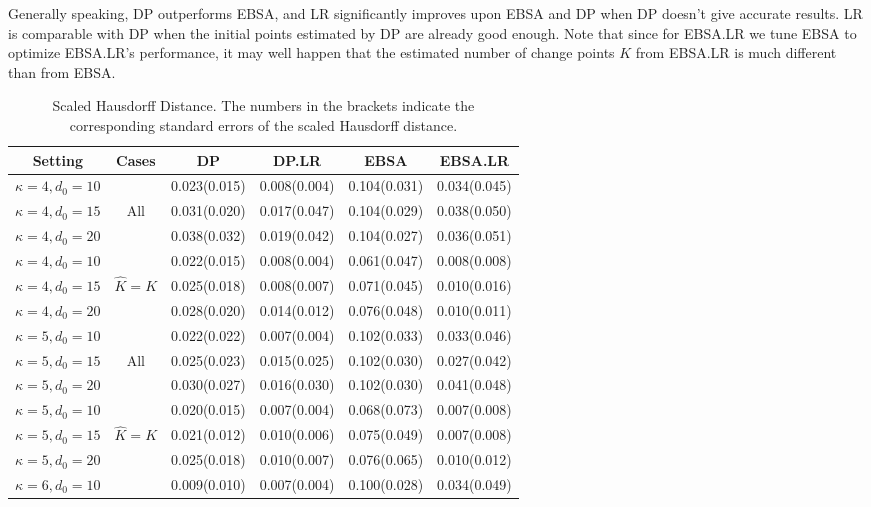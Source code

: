 \documentclass[twoside]{article}
\begin{document}
Generally speaking, DP outperforms EBSA, and LR significantly improves upon EBSA and DP when DP doesn't give accurate results.  LR is comparable with DP when the initial points estimated by DP are already good enough.  Note that since for EBSA.LR we tune EBSA to optimize EBSA.LR's performance, it may well happen that the estimated number of change points $K$ from EBSA.LR is much different than from EBSA.
\begin{table}[h]
\caption{Scaled Hausdorff Distance. The numbers in the brackets indicate the corresponding standard errors of the scaled Hausdorff distance.}
\label{error-table}
    \begin{center}
    \begin{tabular}{c c c c c c}
         \hline\hline
         Setting & Cases & DP & DP.LR & EBSA & EBSA.LR \\
         \hline
         $\kappa = 4, d_0 = 10$ & & 0.023(0.015) &0.008(0.004) &0.104(0.031) &0.034(0.045)  \\
         $\kappa = 4, d_0 = 15$ & All &0.031(0.020) &0.017(0.047) &0.104(0.029) &0.038(0.050) \\
         $\kappa = 4, d_0 = 20$ & &0.038(0.032) &0.019(0.042) &0.104(0.027) & 0.036(0.051)\\
         \hline
         $\kappa = 4, d_0 = 10$ & & 0.022(0.015) &0.008(0.004) & 0.061(0.047) & 0.008(0.008)\\
         $\kappa = 4, d_0 = 15$ & $\hat{K} = K$ & 0.025(0.018) &0.008(0.007) &0.071(0.045) & 0.010(0.016)\\
         $\kappa = 4, d_0 = 20$ & &0.028(0.020) &0.014(0.012) &0.076(0.048) & 0.010(0.011)\\
         \hline
         $\kappa = 5, d_0 = 10$ & &0.022(0.022) & 0.007(0.004) &0.102(0.033) & 0.033(0.046)\\
         $\kappa = 5, d_0 = 15$ & All &0.025(0.023) &0.015(0.025) &0.102(0.030) & 0.027(0.042)\\
         $\kappa = 5, d_0 = 20$ & &0.030(0.027) &0.016(0.030) &0.102(0.030) & 0.041(0.048)\\
         \hline
         $\kappa = 5, d_0 = 10$ & &0.020(0.015) &0.007(0.004) &0.068(0.073) & 0.007(0.008)\\
         $\kappa = 5, d_0 = 15$ & $\hat{K} = K$ &0.021(0.012) &0.010(0.006) &0.075(0.049) & 0.007(0.008)\\
         $\kappa = 5, d_0 = 20$ & &0.025(0.018) &0.010(0.007) &0.076(0.065) & 0.010(0.012)\\
         \hline
         $\kappa = 6, d_0 = 10$ & &0.009(0.010) &0.007(0.004) &0.100(0.028) & 0.034(0.049)\\

\end{tabular}
\end{center}
\end{table}
\end{document}
